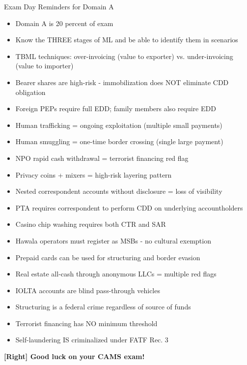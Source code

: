 \documentclass[11pt,a4paper]{beamer}
\newcommand{\greennote}[1]{\textcolor{green!50!black}{\textbf{[Right] #1}}}
\begin{document}
	\begin{frame}{Exam Day Reminders for Domain A}
		\begin{itemize}
			\item Domain A is 20 percent of exam
			\item Know the THREE stages of ML and be able to identify them in scenarios
			\item TBML techniques: over-invoicing (value to exporter) vs. under-invoicing (value to importer)
			\item Bearer shares are high-risk - immobilization does NOT eliminate CDD obligation
			\item Foreign PEPs require full EDD; family members also require EDD
			\item Human trafficking = ongoing exploitation (multiple small payments)
			\item Human smuggling = one-time border crossing (single large payment)
			\item NPO rapid cash withdrawal = terrorist financing red flag
			\item Privacy coins + mixers = high-risk layering pattern
			\item Nested correspondent accounts without disclosure = loss of visibility
			\item PTA requires correspondent to perform CDD on underlying accountholders
			\item Casino chip washing requires both CTR and SAR
			\item Hawala operators must register as MSBs - no cultural exemption
			\item Prepaid cards can be used for structuring and border evasion
			\item Real estate all-cash through anonymous LLCs = multiple red flags
			\item IOLTA accounts are blind pass-through vehicles
			\item Structuring is a federal crime regardless of source of funds
			\item Terrorist financing has NO minimum threshold
			\item Self-laundering IS criminalized under FATF Rec. 3
		\end{itemize}
		\vspace{0.3cm}
		\centering
		\greennote{Good luck on your CAMS exam!}
	\end{frame}
	
\end{document}
